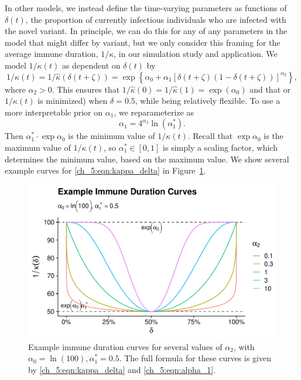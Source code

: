 In other models, we instead define the time-varying parameters as functions of \( \delta(t) \), the proportion of currently infectious individuals who are infected with the novel variant.
In principle, we can do this for any of any parameters in the model that might differ by variant, but we only consider this framing for the average immune duration, \( 1 / \kappa \), in our simulation study and application.
We model \( 1 / \kappa(t) \) as dependent on \( \delta(t) \) by
\begin{equation}
    1 / \kappa(t) = 1 / \hat{\kappa}\left( \delta (t + \zeta) \right) = \exp \left\{ \alpha_0 + \alpha_1 \left[ \delta(t + \zeta) \left( 1 - \delta(t + \zeta) \right) \right]^{\alpha_2} \right\},
    \label{ch_5:eqn:kappa_delta}
\end{equation}
where \( \alpha_2 > 0 \).
This ensures that \( 1 / \hat{\kappa}(0) = 1 / \hat{\kappa}(1) = \exp \left( \alpha_0 \right)\) and that or \( 1 / \kappa(t) \) is minimized) when \( \delta = 0.5 \), while being relatively flexible.
To use a more interpretable prior on \( \alpha_1 \), we reparameterize as 
\begin{equation}
    \alpha_1 = 4^{\alpha_2} \ln \left( \alpha_1^* \right).
    \label{ch_5:eqn:alpha_1}
\end{equation}
Then \( \alpha_1^* \cdot \exp \alpha_0 \) is the minimum value of \( 1 / \kappa (t) \).
Recall that \( \exp \alpha_0 \) is the maximum value of \( 1 / \kappa (t) \), so \( \alpha_1^* \in [0,1] \) is simply a scaling factor, which determines the minimum value, based on the maximum value.
We show several example curves for \eqref{ch_5:eqn:kappa_delta} in Figure~\ref{ch_5:fig:example_immune_durration_plot}.

\begin{figure}
    \centering
    \includegraphics[width=1.0\columnwidth]{example_immune_durration_plot.pdf}
    \caption[Example immune duration curves.]{Example immune duration curves for several values of \( \alpha_2 \), with \( \alpha_0 = \ln\left(100\right), \alpha_1^* = 0.5 \).
    The full formula for these curves is given by \eqref{ch_5:eqn:kappa_delta} and \eqref{ch_5:eqn:alpha_1}.}
    \label{ch_5:fig:example_immune_durration_plot}
\end{figure}

